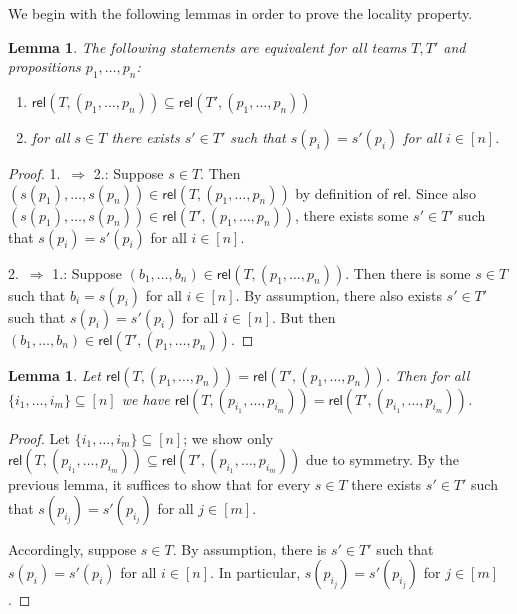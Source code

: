 \documentclass[a4paper,english,fleqn,11pt,final]{scrartcl}
\newcommand{\rel}{\mathsf{rel}}
\theoremstyle{plain}
\newtheorem{lemma}[theorem]{Lemma}
\theoremstyle{definition}
\begin{document}
We begin with the following lemmas in order to prove the locality property.

\begin{lemma}\label{lem:rel-equality}
The following statements are equivalent for all teams $T,T'$ and propositions $p_1,\ldots,p_n$:
\begin{enumerate}
\item $\rel(T, (p_1,\ldots,p_n)) \subseteq \rel(T', (p_1,\ldots,p_n))$
\item for all $s \in T$ there exists $s' \in T'$ such that $s(p_i) = s'(p_i)$ for all $i \in [n]$.
\end{enumerate}
\end{lemma}
\begin{proof}
1.\ $\Rightarrow$ 2.:
Suppose $s \in T$.
Then $(s(p_1),\ldots,s(p_n)) \in \rel(T,(p_1,\ldots,p_n))$ by definition of $\rel$.
Since also $(s(p_1),\ldots,s(p_n)) \in \rel(T',(p_1,\ldots,p_n))$, there exists some $s' \in T'$ such that $s(p_i) = s'(p_i)$ for all $i \in [n]$.

2.\ $\Rightarrow$ 1.:
Suppose $(b_1,\ldots,b_n) \in \rel(T, (p_1,\ldots,p_n))$.
Then there is some $s \in T$ such that $b_i = s(p_i)$ for all $i \in [n]$.
By assumption, there also exists $s' \in T'$ such that $s(p_i) = s'(p_i)$ for all $i \in [n]$.
But then $(b_1,\ldots,b_n) \in \rel(T', (p_1,\ldots,p_n))$.
\end{proof}

\begin{lemma}
Let $\rel(T,(p_1,\ldots,p_n)) = \rel(T',(p_1,\ldots,p_n))$.
Then for all $\{i_1,\ldots,i_m\} \subseteq [n]$ we have $\rel(T,(p_{i_1},\ldots,p_{i_m})) = \rel(T',(p_{i_1},\ldots,p_{i_m}))$.
\end{lemma}
\begin{proof}
Let $\{i_1,\ldots,i_m\} \subseteq [n]$; we show only $\rel(T,(p_{i_1},\ldots,p_{i_m})) \subseteq \rel(T',(p_{i_1},\ldots,p_{i_m}))$ due to symmetry.
By the previous lemma, it suffices to show that for every $s \in T$ there exists $s' \in T'$ such that $s(p_{i_j}) = s'(p_{i_j})$ for all $j \in [m]$.

Accordingly, suppose $s \in T$.
By assumption, there is $s' \in T'$ such that $s(p_{i}) = s'(p_i)$ for all $i \in [n]$.
In particular, $s(p_{i_j}) = s'(p_{i_j})$ for $j \in [m]$.
\end{proof}
\end{document}
